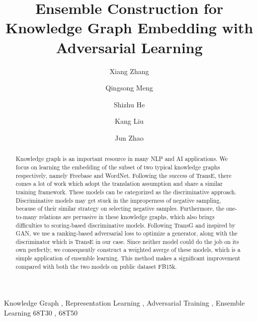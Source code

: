 \documentclass[twocolumn,a4paper,preprint,10pt,3p]{elsarticle}
\begin{document}

\begin{frontmatter}

\title{Ensemble Construction for Knowledge Graph Embedding with Adversarial Learning}


\author[hrbaddress]{Xiang Zhang}

\author[hrbaddress]{Qingsong Meng}

\author[ucasaddress]{Shizhu He}

\author[ucasaddress]{Kang Liu}

\author[ucasaddress]{Jun Zhao}

\address[hrbaddress]{Harbin University of Science and Technology, No.52 Xuefu Road, Nangang District, Harbin, 150080, China}
\address[ucasaddress]{University of Chinese Academy of Sciences, No.19(A) Yuquan Road, Shijingshan District, Beijing, 100049, China}


\begin{abstract}
Knowledge graph is an important resource in many NLP and AI applications. We focus on learning the embedding of the subset of two typical knowledge graphs respectively, namely Freebase and WordNet. Following the success of TransE, there comes a lot of work which adopt the translation assumption and share a similar training framework. These models can be categorized as the discriminative approach. Discriminative models may get stuck in the improperness of negative sampling, because of their similar strategy on selecting negative samples. Furthermore, the one-to-many relations are pervasive in these knowledge graphs, which also brings difficulties to scoring-based discriminative models. Following TransG and inspired by GAN, we use a ranking-based adversarial loss to optimize a generator, along with the discriminator which is TransE in our case. Since neither model could do the job on its own perfectly, we consequently construct a weighted averge of these models, which is a simple application of ensemble learning. This method makes a significant improvement compared with both the two models on public dataset FB15k.
\end{abstract}

\begin{keyword}
Knowledge Graph \sep{} Representation Learning \sep{} Adversarial Training \sep{} Ensemble Learning
\MSC[2010] 68T30 \sep{} 68T50
\end{keyword}

\end{frontmatter}
\end{document}
